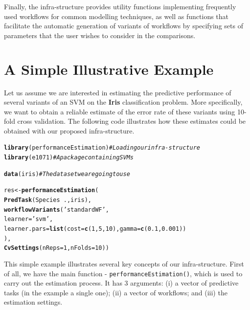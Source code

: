 \documentclass[10pt,a4paper]{article}\usepackage[]{graphicx}\usepackage[]{color}
\makeatletter
\newcommand{\hlnum}[1]{\textcolor[rgb]{0.686,0.059,0.569}{#1}}%
\newcommand{\hlstr}[1]{\textcolor[rgb]{0.192,0.494,0.8}{#1}}%
\newcommand{\hlcom}[1]{\textcolor[rgb]{0.678,0.584,0.686}{\textit{#1}}}%
\newcommand{\hlopt}[1]{\textcolor[rgb]{0,0,0}{#1}}%
\newcommand{\hlstd}[1]{\textcolor[rgb]{0.345,0.345,0.345}{#1}}%
\newcommand{\hlkwb}[1]{\textcolor[rgb]{0.69,0.353,0.396}{#1}}%
\newcommand{\hlkwc}[1]{\textcolor[rgb]{0.333,0.667,0.333}{#1}}%
\newcommand{\hlkwd}[1]{\textcolor[rgb]{0.737,0.353,0.396}{\textbf{#1}}}%
\newenvironment{kframe}{%
 \def\at@end@of@kframe{}%
 \ifinner\ifhmode%
  \def\at@end@of@kframe{\end{minipage}}%
  \begin{minipage}{\columnwidth}%
 \fi\fi%
 \def\FrameCommand##1{\hskip\@totalleftmargin \hskip-\fboxsep
 \colorbox{shadecolor}{##1}\hskip-\fboxsep
     \hskip-\linewidth \hskip-\@totalleftmargin \hskip\columnwidth}%
 \MakeFramed {\advance\hsize-\width
   \@totalleftmargin\z@ \linewidth\hsize
   \@setminipage}}%
 {\par\unskip\endMakeFramed%
 \at@end@of@kframe}
\newenvironment{knitrout}{}{} %
\makeatother
\begin{document}
Finally, the infra-structure provides utility functions
implementing frequently used workflows for common modelling techniques, as
well as functions that facilitate the automatic generation of variants
of workflows by specifying sets of parameters that the user wishes to
consider in the comparisons.

\section{A Simple Illustrative Example}\label{sec:simpleEx}

Let us assume we are interested in estimating the predictive performance of several variants of
an SVM on the
\textbf{Iris} classification problem. More specifically, we want to
obtain a reliable estimate of the error rate of these variants using
10-fold cross validation. The following code illustrates how these
estimates could be obtained with our proposed infra-structure.

\begin{knitrout}\footnotesize
{}\color{fgcolor}\begin{kframe}
\begin{alltt}
\hlkwd{library}\hlstd{(performanceEstimation)}  \hlcom{# Loading our infra-structure}
\hlkwd{library}\hlstd{(e1071)}                  \hlcom{# A package containing SVMs}

\hlkwd{data}\hlstd{(iris)}                      \hlcom{# The data set we are going to use}

\hlstd{res} \hlkwb{<-} \hlkwd{performanceEstimation}\hlstd{(}
         \hlkwd{PredTask}\hlstd{(Species} \hlopt{~} \hlstd{.,iris),}
         \hlkwd{workflowVariants}\hlstd{(}\hlstr{'standardWF'}\hlstd{,}
                          \hlkwc{learner}\hlstd{=}\hlstr{'svm'}\hlstd{,}
                          \hlkwc{learner.pars}\hlstd{=}\hlkwd{list}\hlstd{(}\hlkwc{cost}\hlstd{=}\hlkwd{c}\hlstd{(}\hlnum{1}\hlstd{,}\hlnum{5}\hlstd{,}\hlnum{10}\hlstd{),}\hlkwc{gamma}\hlstd{=}\hlkwd{c}\hlstd{(}\hlnum{0.1}\hlstd{,}\hlnum{0.001}\hlstd{))}
                         \hlstd{),}
         \hlkwd{CvSettings}\hlstd{(}\hlkwc{nReps}\hlstd{=}\hlnum{1}\hlstd{,}\hlkwc{nFolds}\hlstd{=}\hlnum{10}\hlstd{))}
\end{alltt}
\end{kframe}
\end{knitrout}


This simple example illustrates several key concepts of our
infra-structure. First of all, we have the main function  -
\texttt{performanceEstimation()}, which is used to carry out
the estimation process. It has 3 arguments: (i) a vector of
predictive tasks (in the example a single one); (ii) a vector of workflows; and (iii) the
estimation settings. 
\end{document}
